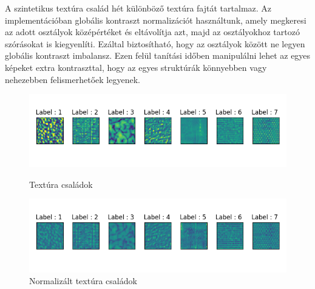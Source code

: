 \documentclass[12pt, english]{article}
\begin{document}
\vspace{4mm}

\par A szintetikus textúra család hét különböző textúra fajtát tartalmaz. Az implementációban globális kontraszt normalizációt használtunk, amely megkeresi az adott osztályok középértéket és eltávolítja azt, majd az osztályokhoz tartozó szórásokat is kiegyenlíti. Ezáltal biztosítható, hogy az osztályok között ne legyen globális kontraszt imbalansz. Ezen felül tanítási időben manipulálni lehet az egyes képeket extra kontraszttal, hogy az egyes struktúrák könnyebben vagy nehezebben felismerhetőek legyenek.

\vspace{4mm}

\begin{figure}[H] 
  \label{fig:texture-families} 
  \begin{minipage}{0.48\linewidth}
    \centering
    \includegraphics[width=.95\linewidth]{default.png} 
    \caption{Textúra családok} 
  \end{minipage}
  \begin{minipage}{0.48\linewidth}
    \centering
    \includegraphics[width=.95\linewidth]{normalized.png} 
    \caption{Normalizált textúra családok} 
  \end{minipage} 
  

\end{figure}
\end{document}
